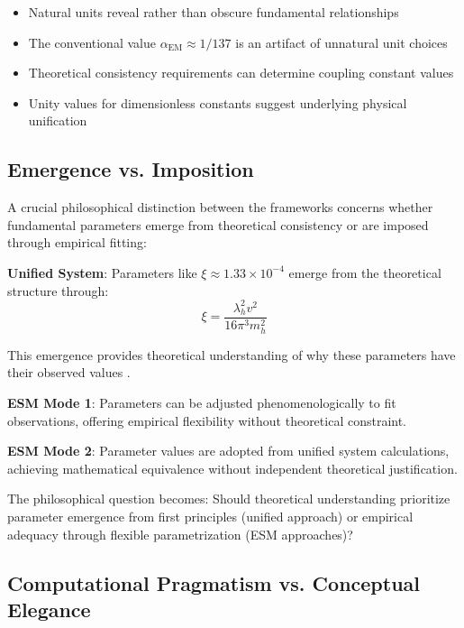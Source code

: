 \documentclass[12pt,a4paper]{article}
\newcommand{\alphaEM}{\alpha_{\text{EM}}}
\newcommand{\xipar}{\xi}
\begin{document}
	\begin{itemize}
		\item Natural units reveal rather than obscure fundamental relationships
		\item The conventional value $\alphaEM \approx 1/137$ is an artifact of unnatural unit choices
		\item Theoretical consistency requirements can determine coupling constant values
		\item Unity values for dimensionless constants suggest underlying physical unification
	\end{itemize}
	
	\subsection{Emergence vs. Imposition}
	\label{subsec:emergence_imposition}
	
	A crucial philosophical distinction between the frameworks concerns whether fundamental parameters emerge from theoretical consistency or are imposed through empirical fitting:
	
	\textbf{Unified System}: Parameters like $\xipar \approx 1.33 \times 10^{-4}$ emerge from the theoretical structure through:
	\begin{equation}
		\xipar = \frac{\lambda_h^2 v^2}{16\pi^3 m_h^2}
	\end{equation}
	
	This emergence provides theoretical understanding of why these parameters have their observed values \cite{pascher_beta_derivation_2025}.
	
	\textbf{ESM Mode 1}: Parameters can be adjusted phenomenologically to fit observations, offering empirical flexibility without theoretical constraint.
	
	\textbf{ESM Mode 2}: Parameter values are adopted from unified system calculations, achieving mathematical equivalence without independent theoretical justification.
	
	The philosophical question becomes: Should theoretical understanding prioritize parameter emergence from first principles (unified approach) or empirical adequacy through flexible parametrization (ESM approaches)? \cite{vanFraassen1980}
	
	\subsection{Computational Pragmatism vs. Conceptual Elegance}
	\label{subsec:pragmatism_vs_elegance}
	
\end{document}
